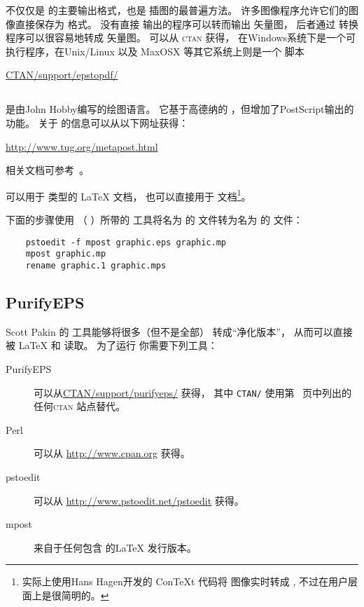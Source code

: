  不仅仅是 \pdfTeX{} 的主要输出格式，也是 \pdfTeX{} 插图的最普遍方法。
许多图像程序允许它们的图像直接保存为  格式。
没有直接  输出的程序可以转而输出  矢量图，
后者通过  转换程序可以很容易地转成  矢量图。
 可以从 \textsc{ctan} 获得，
在Windows系统下是一个可执行程序，在Unix/Linux 以及 MaxOSX 等其它系统上则是一个 脚本
\begin{center}
\href{ftp://ctan.tug.org/tex-archive/support/epstopdf/}{CTAN/support/epstopdf/}
\end{center}

\subsection{\MetaPost}\label{ssec:metapost}
\MetaPost{} 是由John Hobby编写的绘图语言。
它基于高德纳的 \MetaFont ，但增加了PostScript输出的功能。
关于 \MetaPost{} 的信息可以从以下网址获得：
\begin{center}
\url{http://www.tug.org/metapost.html}
\end{center}
相关文档可参考~\cite{metapost-doc}。

\MetaPost 可以用于  类型的 \LaTeX{} 文档，
也可以直接用于 \pdfLaTeX{} 文档\footnote{
	\pdfLaTeX{} 实际上使用Hans Hagen开发的 {Con\TeX t} 代码将 \MetaPost{} 图像实时转成 ,
	不过在用户层面上是很简明的。}。

下面的步骤使用 \MetaPost（  ）所带的  工具将名为  的  文件转为名为  的 \MetaPost{} 文件：

\begin{verbatim}
	pstoedit -f mpost graphic.eps graphic.mp
	mpost graphic.mp
	rename graphic.1 graphic.mps
\end{verbatim}

\subsection{PurifyEPS}\label{ssec:purifyeps}
Scott Pakin 的  工具能够将很多（但不是全部）  转成“净化版本”，
从而可以直接被 \LaTeX{} 和 \pdfLaTeX{} 读取。
为了运行  你需要下列工具：
\begin{description}
	\item[PurifyEPS] 可以从\href{ftp://ctan.tug.org/tex-archive/support/purifyeps/}{CTAN/support/purifyeps/} 获得，
	其中 \texttt{CTAN/} 使用第~\pageref{ctan-sites} 页中列出的任何\textsc{ctan} 站点替代。
	\item[Perl] 可以从 \url{http://www.cpan.org} 获得。
	\item[pstoedit] 可以从 \url{http://www.pstoedit.net/pstoedit} 获得。
	\item[mpost] 来自于任何包含 \MetaPost{} 的\LaTeX{} 发行版本。
\end{description}


